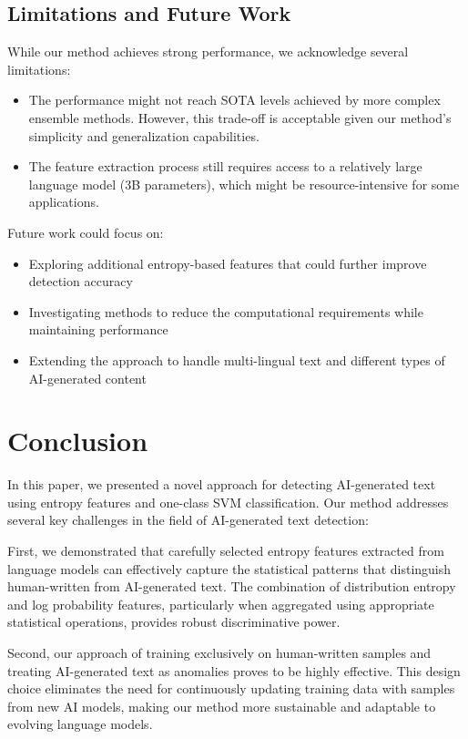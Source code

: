 \subsection{Limitations and Future Work}
While our method achieves strong performance, we acknowledge several limitations:

\begin{itemize}
    \item The performance might not reach SOTA levels achieved by more complex ensemble methods. However, this trade-off is acceptable given our method's simplicity and generalization capabilities.
    
    \item The feature extraction process still requires access to a relatively large language model (3B parameters), which might be resource-intensive for some applications.
\end{itemize}

Future work could focus on:
\begin{itemize}
    \item Exploring additional entropy-based features that could further improve detection accuracy
    \item Investigating methods to reduce the computational requirements while maintaining performance
    \item Extending the approach to handle multi-lingual text and different types of AI-generated content
\end{itemize}

\section{Conclusion}
\label{Conclusion}

In this paper, we presented a novel approach for detecting AI-generated text using entropy features and one-class SVM classification. Our method addresses several key challenges in the field of AI-generated text detection:

First, we demonstrated that carefully selected entropy features extracted from language models can effectively capture the statistical patterns that distinguish human-written from AI-generated text. The combination of distribution entropy and log probability features, particularly when aggregated using appropriate statistical operations, provides robust discriminative power.

Second, our approach of training exclusively on human-written samples and treating AI-generated text as anomalies proves to be highly effective. This design choice eliminates the need for continuously updating training data with samples from new AI models, making our method more sustainable and adaptable to evolving language models.

